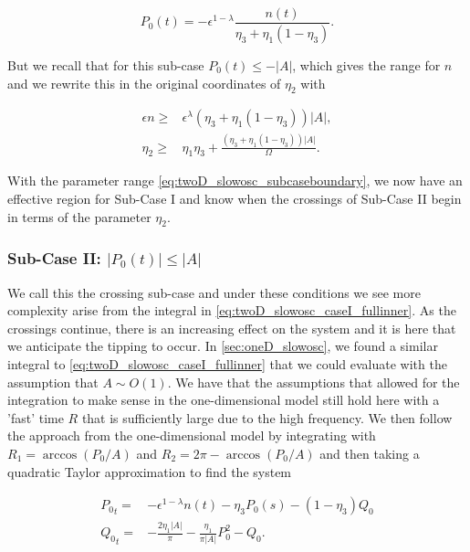 \begin{equation*}
P_0(t) = -\epsilon^{1-\lambda}\frac{n(t)}{\eta_3+\eta_1(1-\eta_3)}.
\end{equation*}

But we recall that for this sub-case $P_0(t)\le -|A|$, which gives the range for $n$ and we rewrite this in the original coordinates of $\eta_2$ with

\begin{equation}\label{eq:twoD_slowosc_subcaseboundary}
\begin{aligned}
\epsilon n \ge & \epsilon^\lambda (\eta_3+\eta_1(1-\eta_3))|A|,\\
\eta_2 \ge& \eta_1\eta_3 +\frac{(\eta_3+\eta_1(1-\eta_3))|A|}{\Omega}.
\end{aligned}
\end{equation}

With the parameter range \eqref{eq:twoD_slowosc_subcaseboundary}, we now have an effective region for Sub-Case I and know when the crossings of Sub-Case II begin in terms of the parameter $\eta_2$.

\subsubsection{Sub-Case II: $|P_0(t)|\le |A|$}

We call this the crossing sub-case and under these conditions we see more complexity arise from the integral in \eqref{eq:twoD_slowosc_caseI_fullinner}. As the crossings continue, there is an increasing effect on the system and it is here that we anticipate the tipping to occur. In \autoref{sec:oneD_slowosc}, we found a similar integral to \eqref{eq:twoD_slowosc_caseI_fullinner} that we could evaluate with the assumption that $A\sim O(1)$. We have that the assumptions that allowed for the integration to make sense in the one-dimensional model still hold here with a 'fast' time $R$ that is sufficiently large due to the high frequency. We then follow the approach from the one-dimensional model by integrating with $R_1=\arccos(P_0/A)$ and $R_2 = 2\pi-\arccos(P_0/A)$ and then taking a quadratic Taylor approximation to find the system

\begin{equation}\label{eq:twoD_slowosc_subcaseII_taylor}
\begin{aligned}
{P_0}_t =& -\epsilon^{1-\lambda}n(t)-\eta_3 P_0(s)-(1-\eta_3)Q_0\\
{Q_0}_t =&-\frac{2\eta_1|A|}{\pi}-\frac{\eta_1}{\pi|A|}P_0^2-Q_0.
\end{aligned}
\end{equation}

